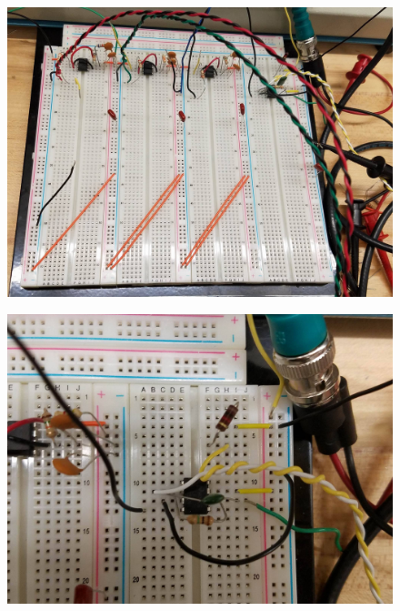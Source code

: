 \documentclass[paper=letter, fontsize=12pt]{article}
\begin{document}
\begin{figure}[H]
\centering
\begin{minipage}{.3\textwidth}
  \centering
  \includegraphics[width=.99\linewidth]{rawcircuit.jpg}
  \label{rawcircuit}
\end{minipage}%
\begin{minipage}{.3\textwidth}
  \centering
  \includegraphics[width=.99\linewidth]{rawopamp.jpg}
  \label{rawopamp}
\end{minipage}%
\begin{minipage}{.3\textwidth}
  \centering

\end{minipage}
\end{figure}
\end{document}
